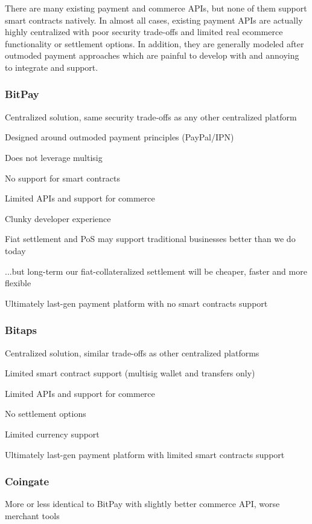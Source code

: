 \documentclass[11pt]{article}
\begin{document}
There are many existing payment and commerce APIs, but none of them support smart contracts natively. In almost all cases, existing payment APIs are actually highly centralized with poor security trade-offs and limited real ecommerce functionality or settlement options. In addition, they are generally modeled after outmoded payment approaches which are painful to develop with and annoying to integrate and support.


\subsubsection{BitPay}

Centralized solution, same security trade-offs as any other centralized platform


Designed around outmoded payment principles (PayPal/IPN)


Does not leverage multisig


No support for smart contracts


Limited APIs and support for commerce


Clunky developer experience


Fiat settlement and PoS may support traditional businesses better than we do today


...but long-term our fiat-collateralized settlement will be cheaper, faster and more flexible


Ultimately last-gen payment platform with no smart contracts support


\subsubsection{Bitaps}

Centralized solution, similar trade-offs as other centralized platforms


Limited smart contract support (multisig wallet and transfers only)


Limited APIs and support for commerce


No settlement options


Limited currency support


Ultimately last-gen payment platform with limited smart contracts support


\subsubsection{Coingate}

More or less identical to BitPay with slightly better commerce API, worse merchant tools
\end{document}
